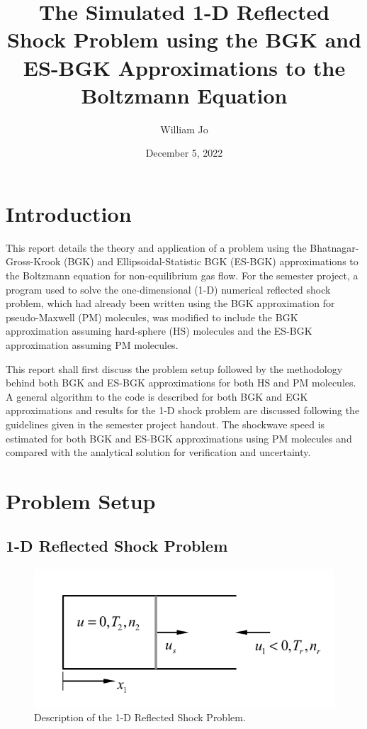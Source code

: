 \documentclass[a4paper]{article}
\title{The Simulated 1-D Reflected Shock Problem using the BGK and ES-BGK Approximations to the Boltzmann Equation}
\author{William Jo}
\date{December 5, 2022}
\begin{document}
\maketitle

\section{Introduction}
This report details the theory and application of a problem using the Bhatnagar-Gross-Krook (BGK) and Ellipsoidal-Statistic BGK (ES-BGK) approximations to the Boltzmann equation for non-equilibrium gas flow. For the semester project, a program used to solve the one-dimensional (1-D) numerical reflected shock problem, which had already been written using the BGK approximation for pseudo-Maxwell (PM) molecules, was modified to include the BGK approximation assuming hard-sphere (HS) molecules and the ES-BGK approximation assuming PM molecules. 

This report shall first discuss the problem setup followed by the methodology behind both BGK and ES-BGK approximations for both HS and PM molecules. A general algorithm to the code is described for both BGK and EGK approximations and results for the 1-D shock problem are discussed following the guidelines given in the semester project handout. The shockwave speed is estimated for both BGK and ES-BGK approximations using PM molecules and compared with the analytical solution for verification and uncertainty.

\section{Problem Setup}
\subsection{1-D Reflected Shock Problem}

\begin{figure}[hbt!]
    \centering
    \includegraphics[width=14cm]{imgs/Setup.png}
    \caption{Description of the 1-D Reflected Shock Problem.}
    \label{fig1}
\end{figure}
\end{document}
